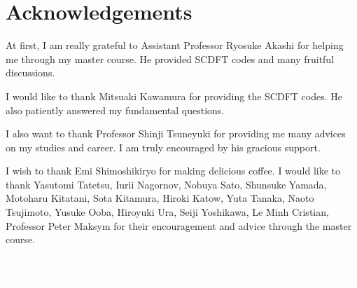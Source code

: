 

\chapter*{Acknowledgements}
At first, I am really grateful to Assistant Professor Ryosuke Akashi for helping me through my 
master course. He provided SCDFT codes and many fruitful discussions.

I would like to thank Mitsuaki Kawamura for providing the SCDFT codes. He also patiently answered
my fundamental questions.

I also want to thank Professor Shinji Tsuneyuki for providing me many advices on my studies and
career. I am truly encouraged by his gracious support.

I wish to thank Emi Shimoshikiryo for making delicious coffee.
I would like to thank Yasutomi Tatetsu, Iurii Nagornov, Nobuya Sato, Shunsuke Yamada, 
Motoharu Kitatani, Sota Kitamura, Hiroki Katow, Yuta Tanaka, Naoto Tsujimoto, Yusuke Ooba, 
Hiroyuki Ura, Seiji Yoshikawa, Le Minh Cristian, Professor Peter Maksym for their encouragement
and advice through the master course.

\textcolor{white}{
 I would lik'e to express my gratitude to Fate/Grand Order and TYPE-MOON projects.
}

\clearpage

